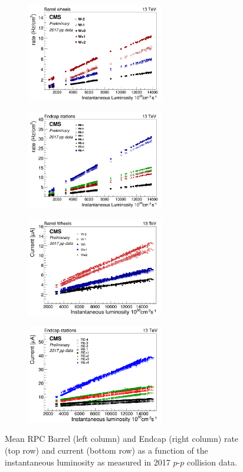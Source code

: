 	\begin{figure}[H]
		\begin{subfigure}{0.5\linewidth}
			\centering
			\includegraphics[height=4.3cm]{fig/chapt5/Rate-vs-Lumi-Barrel.png}
			\caption{\label{fig:Rate-I-vs-Lumi:A}}
		\end{subfigure}
		\begin{subfigure}{0.5\linewidth}
			\centering
			\includegraphics[height=4.3cm]{fig/chapt5/Rate-vs-Lumi-Endcap.png}
			\caption{\label{fig:Rate-I-vs-Lumi:B}}
		\end{subfigure}
		\begin{subfigure}{0.5\linewidth}
			\centering
			\includegraphics[height=4.3cm]{fig/chapt5/Current-vs-Lumi-Barrel.png}
			\caption{\label{fig:Rate-I-vs-Lumi:C}}
		\end{subfigure}
		\begin{subfigure}{0.5\linewidth}
			\centering
			\includegraphics[height=4.3cm]{fig/chapt5/Current-vs-Lumi-Endcap.png}
			\caption{\label{fig:Rate-I-vs-Lumi:D}}
		\end{subfigure}
		\caption{\label{fig:Rate-I-vs-Lumi} Mean RPC Barrel (left column) and Endcap (right column) rate (top row) and current (bottom row) as a function of the instantaneous luminosity as measured in 2017 $p$-$p$ collision data.}
	\end{figure}
	
